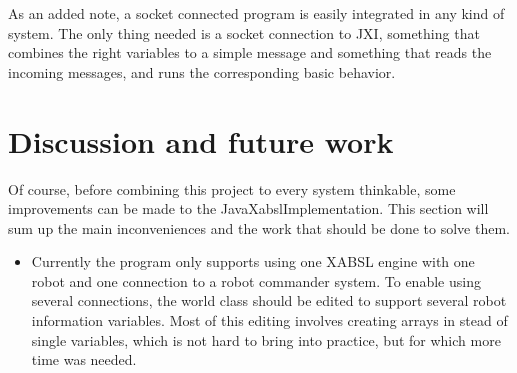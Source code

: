 \documentclass[a4paper,10pt]{article}
\begin{document}
As an added note, a socket connected program is easily integrated in any kind of
system. The only thing needed is a socket connection to JXI, something that
combines the right variables to a simple message and something that reads the
incoming messages, and runs the corresponding basic behavior. 

\section{Discussion and future work}
Of course, before combining this project to every system thinkable, some
improvements can be made to the JavaXabslImplementation. This section will sum
up the main inconveniences and the work that should be done to solve them.
\begin{itemize}
    \item {} Currently the program only supports using one
    XABSL engine with one robot and one connection to a robot commander system.
    To enable using several connections, the world class should be edited to
    support several robot information variables. Most of this editing involves
    creating arrays in stead of single variables, which is not hard to bring
    into practice, but for which more time was needed.
\end{itemize}


{}

\end{document}
